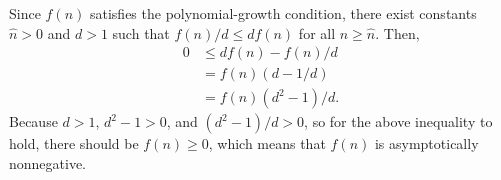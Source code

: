 
\noindent Since $f(n)$ satisfies the polynomial-growth condition, there exist constants $\widehat{n}>0$ and $d>1$ such that $f(n)/d\le df(n)$ for all $n\ge\widehat{n}$.
Then,
\begin{align*}
    0 &\le df(n)-f(n)/d \\
    &= f(n)(d-1/d) \\
    &= f(n)(d^2-1)/d.
\end{align*}
Because $d>1$, $d^2-1>0$, and $(d^2-1)/d>0$, so for the above inequality to hold, there should be $f(n)\ge0$, which means that $f(n)$ is asymptotically nonnegative.
